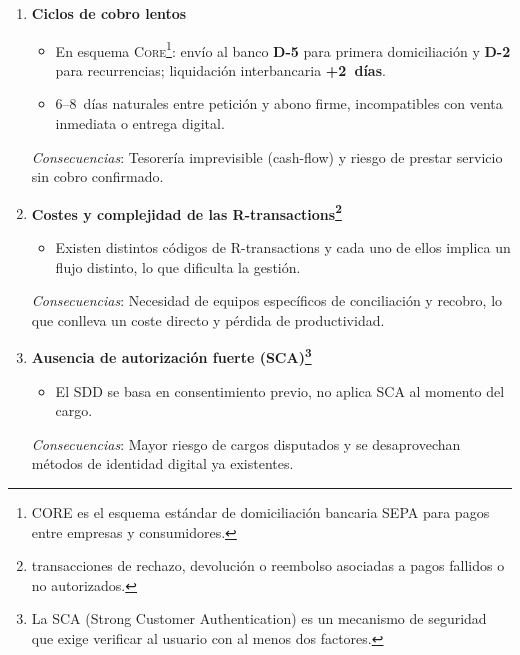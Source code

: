 \begin{enumerate}[label=\textbf{\arabic*.}, leftmargin=0.75cm]
  \item \textbf{Ciclos de cobro lentos}\\
        \begin{itemize}[leftmargin=0.45cm]
            \item En esquema \textsc{Core}\footnote{CORE es el esquema estándar de domiciliación bancaria SEPA para pagos entre empresas y consumidores.}: envío al banco \textbf{D-5} para primera domiciliación y \textbf{D-2} para recurrencias; liquidación interbancaria \textbf{+2~días}.
            \item 6–8~días naturales entre petición y abono firme, incompatibles con venta inmediata o entrega digital.
        \end{itemize}
        \vspace{-0.1cm}
        \textit{Consecuencias}: Tesorería imprevisible (cash-flow) y riesgo de prestar servicio sin cobro confirmado.

  \item \textbf{Costes y complejidad de las R-transactions\footnote{ transacciones de rechazo, devolución o reembolso asociadas a pagos fallidos o no autorizados.}}\\
        \begin{itemize}[leftmargin=0.45cm]
            \item Existen distintos códigos de R-transactions y cada uno de ellos implica un flujo distinto, lo que dificulta la gestión.
        \end{itemize}
        \vspace{-0.1cm}
        \textit{Consecuencias}: Necesidad de equipos específicos de conciliación y recobro, lo que conlleva un coste directo y pérdida de productividad.

  \item \textbf{Ausencia de autorización fuerte (\textsc{SCA})\footnote{La SCA (Strong Customer Authentication) es un mecanismo de seguridad que exige verificar al usuario con al menos dos factores.}}\\
        \begin{itemize}[leftmargin=0.45cm]
            \item El SDD se basa en consentimiento previo, no aplica SCA al momento del cargo.
        \end{itemize}
        \vspace{-0.1cm}
        \textit{Consecuencias}: Mayor riesgo de cargos disputados y se desaprovechan métodos de identidad digital ya existentes.
\end{enumerate}

